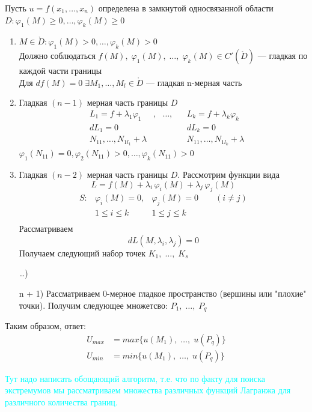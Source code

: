 \begin{Note}
    Пусть $u = f(x_1, \dots, x_n)$ определена в замкнутой односвязанной области $D : \varphi_1(M) \geqslant 0, \dots, \varphi_k(M) \geqslant 0$
    \begin{enumerate}
        \item $M \in \mathring{D}: \varphi_1(M) > 0, \dots, \varphi_k(M) > 0$\\
        Должно соблюдаться $f(M),\; \varphi_1(M),\; \dots,\; \varphi_k(M) \in C'(\mathring{D})$ --- гладкая по каждой части границы\\
        Для $df(M) = 0 \; \exists M_1, \dots, M_l \in \mathring{D}$ --- гладкая n-мерная часть
        
        \item Гладкая $(n-1)$ мерная часть границы $D$
        \begin{align*}
            &L_1 = f + \lambda_1\varphi_1&, &\dots,& &L_k = f + \lambda_k\varphi_k\\
            &dL_1 = 0& && & dL_k = 0\\
            &N_{1 1}, \dots, N_{1 l_1} + \lambda& && &N_{1 1}, \dots, N_{1 l_k} + \lambda
        \end{align*}
        $\varphi_1(N_{1 1}) = 0, \varphi_2(N_{1 1}) > 0, \dots, \varphi_k(N_{1 1}) > 0$
            
        \item Гладкая $(n-2)$ мерная часть границы $D$. Рассмотрим функции вида
        \[
            L = f(M) + \lambda_i\,\varphi_i(M) + \lambda_j\,\varphi_j(M)
        \]
        \begin{align*}
            S: &\varphi_i(M) = 0, &\varphi_j(M) = 0 \qquad (i \neq j)\\ 
            &1 \leqslant i \leqslant k  &1 \leqslant j \leqslant k\\
        \end{align*}
        Рассматриваем
        \[
            dL(M, \lambda_i, \lambda_j) = 0
        \]
        Получаем следующий набор точек $K_1,\; \dots,\; K_s$
        
        \item [\dots)]
        
        \item [n + 1)] Рассматриваем 0-мерное гладкое пространство 
        (вершины или "плохие" точки). Получим следующее множетсво: $P_1,\; \dots,\; P_q$
    \end{enumerate}
    Таким образом, ответ:
    \begin{align*}
        U_{max} &= max\{u(M_1), \; \dots, \; u(P_q)\}\\
        U_{min} &= min\{u(M_1), \; \dots, \; u(P_q)\}
    \end{align*}
\end{Note}
\textcolor{cyan}{Тут надо написать обощающий алгоритм, т.е. что по факту для поиска экстремумов мы рассматриваем множества различных функций Лагранжа для различного количества границ.}